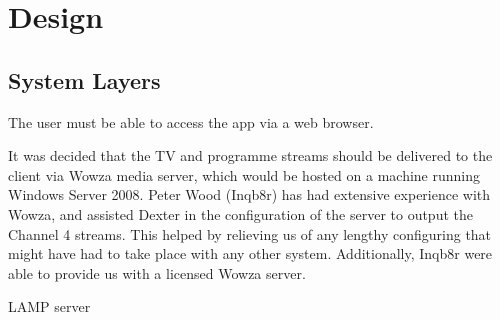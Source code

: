 \section{Design}

\subsection{System Layers}
The user must be able to access the app via a web browser.

It was decided that the TV and programme streams should be delivered to the client via Wowza media server, which would be hosted on a machine running Windows Server 2008. Peter Wood (Inqb8r) has had extensive experience with Wowza, and assisted Dexter in the configuration of the server to output the Channel 4 streams. This helped by relieving us of any lengthy configuring that might have had to take place with any other system. Additionally, Inqb8r were able to provide us with a licensed Wowza server.

LAMP server

